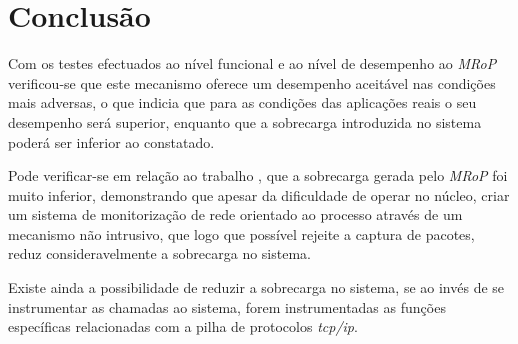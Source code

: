 \section{Conclusão}
\label{sec:five_chap_conclusion}

Com os testes efectuados ao nível funcional e ao nível de desempenho ao \textit{MRoP} verificou-se que este mecanismo oferece um desempenho aceitável nas condições mais adversas, o que indicia que para as condições das aplicações reais o seu desempenho será superior, enquanto que a sobrecarga introduzida no sistema poderá ser inferior ao constatado.

Pode verificar-se em relação ao trabalho \cite{Farruca:2009}, que a sobrecarga gerada pelo \textit{MRoP} foi muito inferior, demonstrando que apesar da dificuldade de operar no núcleo, criar um sistema de monitorização de rede orientado ao processo através de um mecanismo não intrusivo, que logo que possível rejeite a captura de pacotes, reduz consideravelmente a sobrecarga no sistema.

Existe ainda a possibilidade de reduzir a sobrecarga no sistema, se ao invés de se instrumentar as chamadas ao sistema, forem instrumentadas as funções específicas relacionadas com a pilha de protocolos \textit{tcp/ip}.

